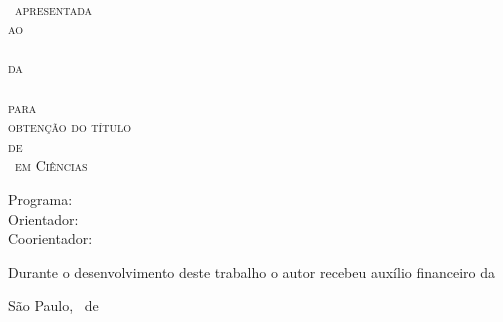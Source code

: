\thispagestyle{empty}
\begin{center}
    \vspace*{2.3cm}
    \textbf{\Large{\titulotrabalho}}\\
    
    \vspace*{1.2cm}
    \Large{\autor}
    
    \vskip 2cm
    \textsc{
    \tipotrabalho~apresentada\\[-0.25cm] 
    ao\\[-0.25cm]
    \instituto\\[-0.25cm]
    da\\[-0.25cm]
    \universidade\\[-0.25cm]
    para\\[-0.25cm]
    obtenção do título\\[-0.25cm]
    de\\[-0.25cm]
    \titulacao~em Ciências}
    
    \vskip 1.5cm
    Programa: \programa\\
    Orientador: \proforientador\\
    Coorientador: \profcoorientador

    \vskip 1cm
    \normalsize{Durante o desenvolvimento deste trabalho o autor recebeu auxílio
    financeiro da \auxiliofinanceiro}
    
    \vskip 0.5cm
    \normalsize{São Paulo, \mes~de \ano}
\end{center}


